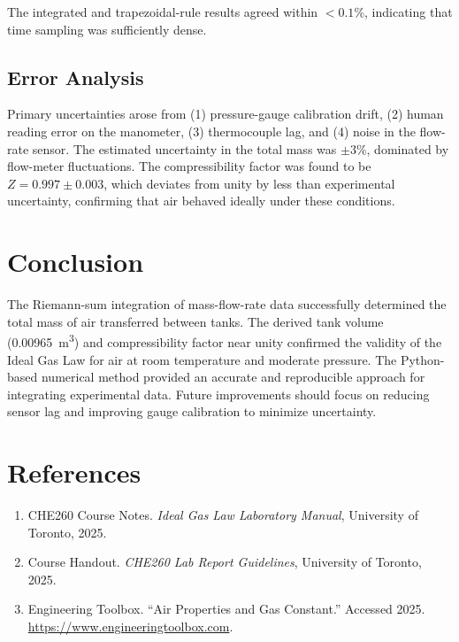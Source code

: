 \documentclass[12pt]{article}
\begin{document}
\label{lst:riemann}

The integrated and trapezoidal-rule results agreed within \(<0.1\%\), indicating that time sampling was sufficiently dense.  



\subsection*{Error Analysis}
Primary uncertainties arose from (1) pressure-gauge calibration drift, (2) human reading error on the manometer, (3) thermocouple lag, and (4) noise in the flow-rate sensor.  
The estimated uncertainty in the total mass was \(\pm 3\%\), dominated by flow-meter fluctuations.  
The compressibility factor was found to be \(Z = 0.997 \pm 0.003\), which deviates from unity by less than experimental uncertainty, confirming that air behaved ideally under these conditions.

\section*{Conclusion}
The Riemann-sum integration of mass-flow-rate data successfully determined the total mass of air transferred between tanks. The derived tank volume (\SI{0.00965}{\metre\cubed}) and compressibility factor near unity confirmed the validity of the Ideal Gas Law for air at room temperature and moderate pressure. The Python-based numerical method provided an accurate and reproducible approach for integrating experimental data. Future improvements should focus on reducing sensor lag and improving gauge calibration to minimize uncertainty.

\section*{References}
\begin{enumerate}
\item CHE260 Course Notes. \textit{Ideal Gas Law Laboratory Manual}, University of Toronto, 2025.
\item Course Handout. \textit{CHE260 Lab Report Guidelines}, University of Toronto, 2025.
\item Engineering Toolbox. “Air Properties and Gas Constant.” Accessed 2025. \url{https://www.engineeringtoolbox.com}.
\end{enumerate}
\end{document}
